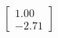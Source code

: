 \documentclass[preview]{standalone}
\begin{document}
\begin{align*}
\begin{bmatrix} 1.00 \\ -2.71 \end{bmatrix}
\end{align*}
\end{document}
